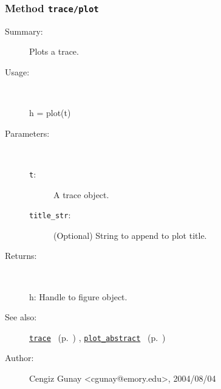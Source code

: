 \subsubsection[Method \texttt{plot}]{Method \texttt{trace/plot}}%
%
\label{ref_trace__plot}%
\hypertarget{ref_trace__plot}{}%
\begin{description}
\item[Summary:]Plots a trace.
%
\item[Usage:]~%
\begin{lyxcode}%
h = plot(t)
%
\end{lyxcode}%
%
%
\item[Parameters:]~
\begin{description}%
\item[\texttt{t}:]
 A trace object.
\item[\texttt{title\_str}:]
 (Optional) String to append to plot title.
\end{description}%
%
\item[Returns:]~

	h: Handle to figure object.
%
%
\item[See also:]%
\hyperlink{ref_trace}{\texttt{trace}}%
\ (p.~\pageref{ref_trace})%
%
, \hyperlink{ref_plot_abstract}{\texttt{plot\_abstract}}%
\ (p.~\pageref{ref_plot_abstract})%
%
%
\item[Author:]%
Cengiz Gunay <cgunay@emory.edu>, 2004/08/04%
\end{description}
\methodline%
